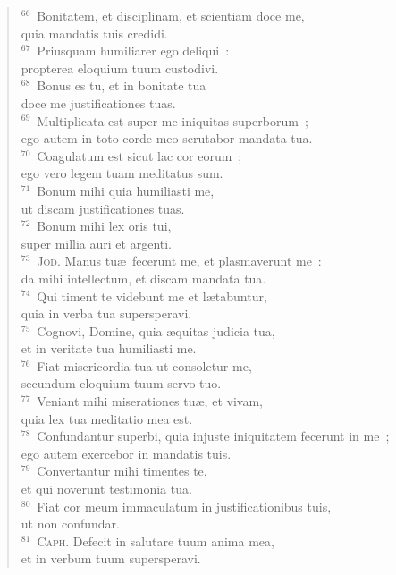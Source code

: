 \begin{verse}
${}^{66}$~Bonitatem, et disciplinam, et scientiam doce me,\\ quia mandatis tuis credidi.\\
${}^{67}$~Priusquam humiliarer ego deliqui~:\\ propterea eloquium tuum custodivi.\\
${}^{68}$~Bonus es tu, et in bonitate tua\\ doce me justificationes tuas.\\
${}^{69}$~Multiplicata est super me iniquitas superborum~;\\ ego autem in toto corde meo scrutabor mandata tua.\\
${}^{70}$~Coagulatum est sicut lac cor eorum~;\\ ego vero legem tuam meditatus sum.\\
${}^{71}$~Bonum mihi quia humiliasti me,\\ ut discam justificationes tuas.\\
${}^{72}$~Bonum mihi lex oris tui,\\ super millia auri et argenti.\\
${}^{73}$~\textsc{Jod.} Manus tu\ae\ fecerunt me, et plasmaverunt me~:\\ da mihi intellectum, et discam mandata tua.\\
${}^{74}$~Qui timent te videbunt me et l\ae tabuntur,\\ quia in verba tua supersperavi.\\
${}^{75}$~Cognovi, Domine, quia \ae quitas judicia tua,\\ et in veritate tua humiliasti me.\\
${}^{76}$~Fiat misericordia tua ut consoletur me,\\ secundum eloquium tuum servo tuo.\\
${}^{77}$~Veniant mihi miserationes tu\ae , et vivam,\\ quia lex tua meditatio mea est.\\
${}^{78}$~Confundantur superbi, quia injuste iniquitatem fecerunt in me~;\\ ego autem exercebor in mandatis tuis.\\
${}^{79}$~Convertantur mihi timentes te,\\ et qui noverunt testimonia tua.\\
${}^{80}$~Fiat cor meum immaculatum in justificationibus tuis,\\ ut non confundar.\\
${}^{81}$~\textsc{Caph.} Defecit in salutare tuum anima mea,\\ et in verbum tuum supersperavi.\\

\end{verse}
